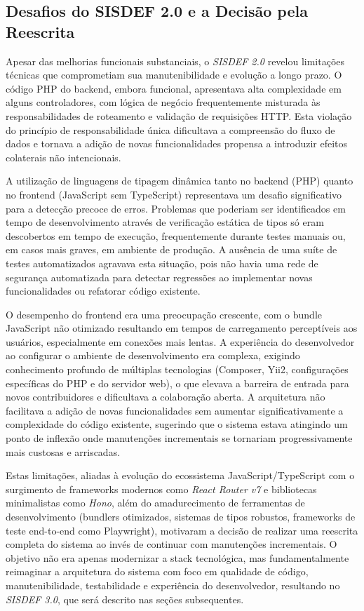 \documentclass[nonacm, sigconf]{acmart}
\begin{document}
\subsection{Desafios do SISDEF 2.0 e a Decisão pela Reescrita}

Apesar das melhorias funcionais substanciais, o \textit{SISDEF 2.0} revelou limitações técnicas que comprometiam sua manutenibilidade e evolução a longo prazo. O código PHP do backend, embora funcional, apresentava alta complexidade em alguns controladores, com lógica de negócio frequentemente misturada às responsabilidades de roteamento e validação de requisições HTTP. Esta violação do princípio de responsabilidade única dificultava a compreensão do fluxo de dados e tornava a adição de novas funcionalidades propensa a introduzir efeitos colaterais não intencionais.

A utilização de linguagens de tipagem dinâmica tanto no backend (PHP) quanto no frontend (JavaScript sem TypeScript) representava um desafio significativo para a detecção precoce de erros. Problemas que poderiam ser identificados em tempo de desenvolvimento através de verificação estática de tipos só eram descobertos em tempo de execução, frequentemente durante testes manuais ou, em casos mais graves, em ambiente de produção. A ausência de uma suíte de testes automatizados agravava esta situação, pois não havia uma rede de segurança automatizada para detectar regressões ao implementar novas funcionalidades ou refatorar código existente.

O desempenho do frontend era uma preocupação crescente, com o bundle JavaScript não otimizado resultando em tempos de carregamento perceptíveis aos usuários, especialmente em conexões mais lentas. A experiência do desenvolvedor ao configurar o ambiente de desenvolvimento era complexa, exigindo conhecimento profundo de múltiplas tecnologias (Composer, Yii2, configurações específicas do PHP e do servidor web), o que elevava a barreira de entrada para novos contribuidores e dificultava a colaboração aberta. A arquitetura não facilitava a adição de novas funcionalidades sem aumentar significativamente a complexidade do código existente, sugerindo que o sistema estava atingindo um ponto de inflexão onde manutenções incrementais se tornariam progressivamente mais custosas e arriscadas.

Estas limitações, aliadas à evolução do ecossistema JavaScript/TypeScript com o surgimento de frameworks modernos como \textit{React Router v7} e bibliotecas minimalistas como \textit{Hono}, além do amadurecimento de ferramentas de desenvolvimento (bundlers otimizados, sistemas de tipos robustos, frameworks de teste end-to-end como Playwright), motivaram a decisão de realizar uma reescrita completa do sistema ao invés de continuar com manutenções incrementais. O objetivo não era apenas modernizar a stack tecnológica, mas fundamentalmente reimaginar a arquitetura do sistema com foco em qualidade de código, manutenibilidade, testabilidade e experiência do desenvolvedor, resultando no \textit{SISDEF 3.0}, que será descrito nas seções subsequentes. 
\end{document}
